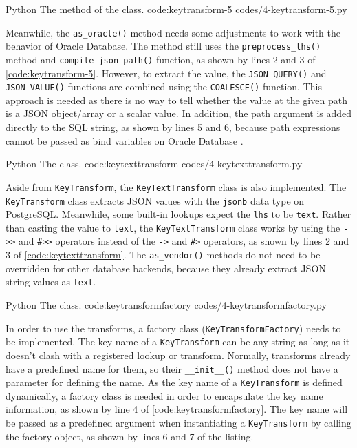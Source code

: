 \listing
{Python}
{The  method of the  class.}
{code:keytransform-5}
{codes/4-keytransform-5.py}

Meanwhile, the \verb|as_oracle()| method needs some adjustments to work with
the behavior of Oracle Database. The method still uses the
\verb|preprocess_lhs()| method and \verb|compile_json_path()| function, as
shown by lines 2 and 3 of \autoref{code:keytransform-5}. However, to extract
the value, the \verb|JSON_QUERY()| and \verb|JSON_VALUE()| functions are
combined using the \verb|COALESCE()| function. This approach is needed as there
is no way to tell whether the value at the given path is a JSON object/array or
a scalar value. In addition, the path argument is added directly to the SQL
string, as shown by lines 5 and 6, because path expressions cannot be passed as
bind variables on Oracle Database \cite{oracle:jsonpath}.

\listing
{Python}
{The  class.}
{code:keytexttransform}
{codes/4-keytexttransform.py}

Aside from \verb|KeyTransform|, the \verb|KeyTextTransform| class is also
implemented. The \verb|KeyTransform| class extracts JSON values with the
\verb|jsonb| data type on PostgreSQL. Meanwhile, some built-in lookups expect
the \verb|lhs| to be \verb|text|. Rather than casting the value to \verb|text|,
the \verb|KeyTextTransform| class works by using the \verb|->>| and \verb|#>>|
operators instead of the \verb|->| and \verb|#>| operators, as shown by lines 2
and 3 of \autoref{code:keytexttransform}. The \verb|as_vendor()| methods do not
need to be overridden for other database backends, because they already extract
JSON string values as \verb|text|.

\listing
{Python}
{The  class.}
{code:keytransformfactory}
{codes/4-keytransformfactory.py}

In order to use the transforms, a factory class (\verb|KeyTransformFactory|)
needs to be implemented. The key name of a \verb|KeyTransform| can be any
string as long as it doesn't clash with a registered lookup or transform.
Normally, transforms already have a predefined name for them, so their
\verb|__init__()| method does not have a parameter for defining the name. As
the key name of a \verb|KeyTransform| is defined dynamically, a factory class
is needed in order to encapsulate the key name information, as shown by line 4
of \autoref{code:keytransformfactory}. The key name will be passed as a
predefined argument when instantiating a \verb|KeyTransform| by calling the
factory object, as shown by lines 6 and 7 of the listing.

